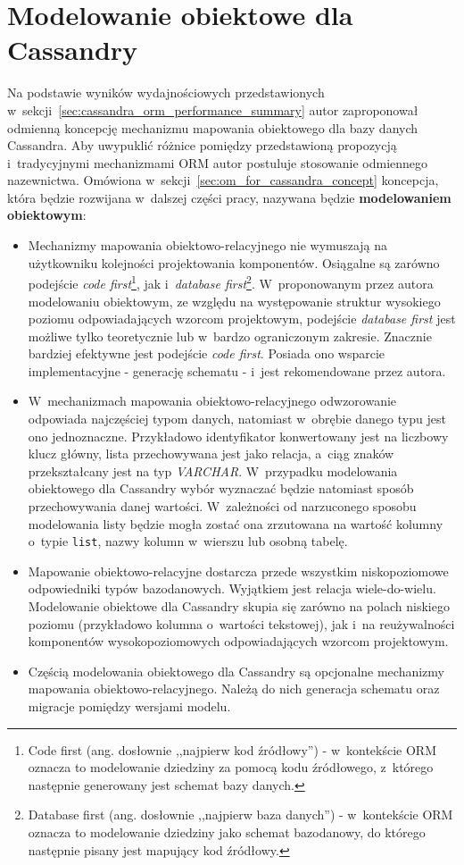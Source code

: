 
\chapter{Modelowanie obiektowe dla Cassandry}
\label{chap:cassandra_object_modeling}

Na podstawie wyników wydajnościowych przedstawionych w~sekcji~\ref{sec:cassandra_orm_performance_summary} autor zaproponował odmienną koncepcję mechanizmu mapowania obiektowego dla bazy danych Cassandra. Aby uwypuklić różnice pomiędzy przedstawioną propozycją i~tradycyjnymi mechanizmami ORM autor postuluje stosowanie odmiennego nazewnictwa. Omówiona w~sekcji~\ref{sec:om_for_cassandra_concept} koncepcja, która będzie rozwijana w~dalszej części pracy, nazywana będzie \textbf{modelowaniem obiektowym}:

\begin{itemize}
	\item Mechanizmy mapowania obiektowo-relacyjnego nie wymuszają na użytkowniku kolejności projektowania komponentów. Osiągalne są zarówno podejście \emph{code first}\footnote{Code first (ang. dosłownie ,,najpierw kod źródłowy'') - w~kontekście ORM oznacza to modelowanie dziedziny za pomocą kodu źródłowego, z~którego następnie generowany jest schemat bazy danych.}, jak i~\emph{database first}\footnote{Database first (ang. dosłownie ,,najpierw baza danych'') - w~kontekście ORM oznacza to modelowanie dziedziny jako schemat bazodanowy, do którego następnie pisany jest mapujący kod źródłowy.}. W~proponowanym przez autora modelowaniu obiektowym, ze względu na występowanie struktur wysokiego poziomu odpowiadających wzorcom projektowym, podejście \emph{database first} jest możliwe tylko teoretycznie lub w~bardzo ograniczonym zakresie. Znacznie bardziej efektywne jest podejście \emph{code first}. Posiada ono wsparcie implementacyjne - generację schematu - i~jest rekomendowane przez autora.
	\item W~mechanizmach mapowania obiektowo-relacyjnego odwzorowanie odpowiada najczęściej typom danych, natomiast w~obrębie danego typu jest ono jednoznaczne. Przykładowo identyfikator konwertowany jest na liczbowy klucz główny, lista przechowywana jest jako relacja, a~ciąg znaków przekształcany jest na typ \emph{VARCHAR}. W~przypadku modelowania obiektowego dla Cassandry wybór wyznaczać będzie natomiast sposób przechowywania danej wartości. W~zależności od narzuconego sposobu modelowania listy będzie mogła zostać ona zrzutowana na wartość kolumny o~typie \verb+list+, nazwy kolumn w~wierszu lub osobną tabelę.
	\item Mapowanie obiektowo-relacyjne dostarcza przede wszystkim niskopoziomowe odpowiedniki typów bazodanowych. Wyjątkiem jest relacja wiele-do-wielu. Modelowanie obiektowe dla Cassandry skupia się zarówno na polach niskiego poziomu (przykładowo kolumna o~wartości tekstowej), jak i~na reużywalności komponentów wysokopoziomowych odpowiadających wzorcom projektowym.
	\item Częścią modelowania obiektowego dla Cassandry są opcjonalne mechanizmy mapowania obiektowo-relacyjnego. Należą do nich generacja schematu oraz migracje pomiędzy wersjami modelu.
\end{itemize}

